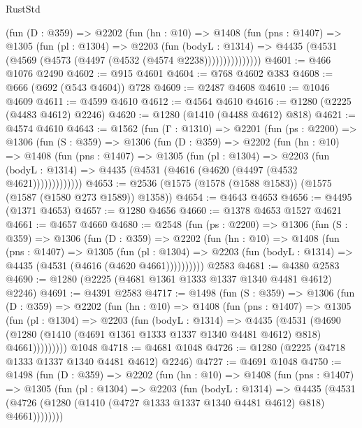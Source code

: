 \begin{lexlean}{RustStd}
\begin{coremodule}
            (fun (D : @359) =>
            @2202
              (fun (hn : @10) =>
              @1408
                (fun (pns : @1407) =>
                @1305
                  (fun (pl : @1304) =>
                  @2203
                    (fun (bodyL : @1314) =>
                    @4435 (@4531 (@4569 (@4573 (@4497 (@4532 (@4574 @2238)))))))))))))))
@4601 := @466 @1076 @2490
@4602 := @915 @4601
@4604 := @768 @4602 @383
@4608 := @666 (@692 (@543 @4604)) @728
@4609 := @2487 @4608
@4610 := @1046 @4609
@4611 := @4599 @4610
@4612 := @4564 @4610
@4616 := @1280 (@2225 (@4483 @4612) @2246)
@4620 := @1280 (@1410 (@4488 @4612) @818)
@4621 := @4574 @4610
@4643 := @1562
    (fun (Γ : @1310) =>
    @2201
      (fun (ps : @2200) =>
      @1306
        (fun (S : @359) =>
        @1306
          (fun (D : @359) =>
          @2202
            (fun (hn : @10) =>
            @1408
              (fun (pns : @1407) =>
              @1305
                (fun (pl : @1304) =>
                @2203
                  (fun (bodyL : @1314) =>
                  @4435 (@4531 (@4616 (@4620 (@4497 (@4532 @4621)))))))))))))
@4653 := @2536 (@1575 (@1578 (@1588 @1583)) (@1575 (@1587 (@1580 @273 @1589)) @1358))
@4654 := @4643 @4653
@4656 := @4495 (@1371 @4653)
@4657 := @1280 @4656
@4660 := @1378 @4653 @1527 @4621
@4661 := @4657 @4660
@4680 := @2548
    (fun (ps : @2200) =>
    @1306
      (fun (S : @359) =>
      @1306
        (fun (D : @359) =>
        @2202
          (fun (hn : @10) =>
          @1408
            (fun (pns : @1407) =>
            @1305
              (fun (pl : @1304) =>
              @2203 (fun (bodyL : @1314) => @4435 (@4531 (@4616 (@4620 @4661))))))))))
    @2583
@4681 := @4380 @2583
@4690 := @1280 (@2225 (@4681 @1361 @1333 @1337 @1340 @4481 @4612) @2246)
@4691 := @4391 @2583
@4717 := @1498
    (fun (S : @359) =>
    @1306
      (fun (D : @359) =>
      @2202
        (fun (hn : @10) =>
        @1408
          (fun (pns : @1407) =>
          @1305
            (fun (pl : @1304) =>
            @2203
              (fun (bodyL : @1314) =>
              @4435
                (@4531
                  (@4690
                    (@1280 (@1410 (@4691 @1361 @1333 @1337 @1340 @4481 @4612) @818) @4661)))))))))
    @1048
@4718 := @4681 @1048
@4726 := @1280 (@2225 (@4718 @1333 @1337 @1340 @4481 @4612) @2246)
@4727 := @4691 @1048
@4750 := @1498
    (fun (D : @359) =>
    @2202
      (fun (hn : @10) =>
      @1408
        (fun (pns : @1407) =>
        @1305
          (fun (pl : @1304) =>
          @2203
            (fun (bodyL : @1314) =>
            @4435
              (@4531 (@4726 (@1280 (@1410 (@4727 @1333 @1337 @1340 @4481 @4612) @818) @4661))))))))

\end{coremodule}
\end{lexlean}
